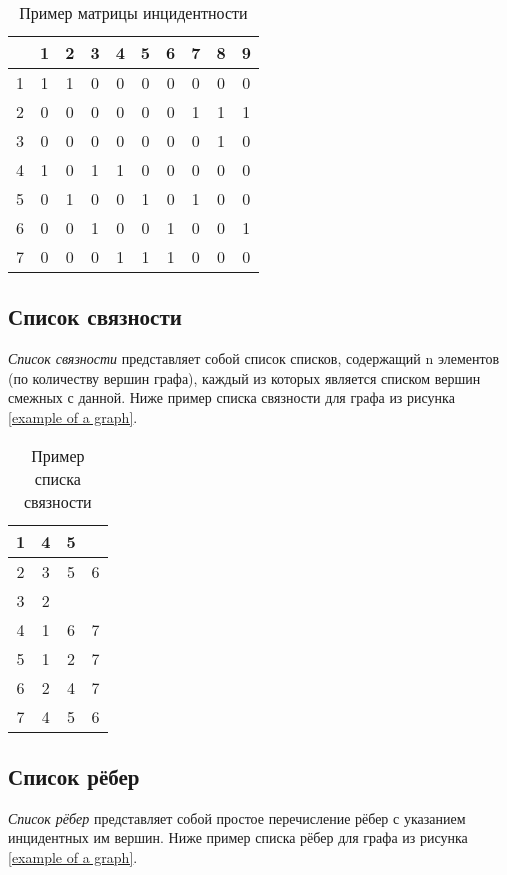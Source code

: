 \begin{table}[h]
	\center
	\begin{tabular}{|c|c|c|c|c|c|c|c|c|c|}
		\hline
		\space & 1 & 2 & 3 & 4 & 5 & 6 & 7 & 8 & 9\\
		\hline
		1 & 1 & 1 & 0 & 0 & 0 & 0 & 0 & 0 & 0\\
		2 & 0 & 0 & 0 & 0 & 0 & 0 & 1 & 1 & 1\\
		3 & 0 & 0 & 0 & 0 & 0 & 0 & 0 & 1 & 0\\
		4 & 1 & 0 & 1 & 1 & 0 & 0 & 0 & 0 & 0\\
		5 & 0 & 1 & 0 & 0 & 1 & 0 & 1 & 0 & 0\\
		6 & 0 & 0 & 1 & 0 & 0 & 1 & 0 & 0 & 1\\
		7 & 0 & 0 & 0 & 1 & 1 & 1 & 0 & 0 & 0\\
		\hline
	\end{tabular}
	\caption{Пример матрицы инцидентности}
\end{table}

\subsection{Список связности}

\emph{Список связности} представляет собой список списков, содержащий n 
элементов (по количеству вершин графа), каждый из которых является списком 
вершин смежных с данной. Ниже пример списка связности для графа из рисунка 
\ref{example of a graph}.

\begin{table}[h]
	\center
	\begin{tabular}{|c|ccc|}
		\hline
		1 & 4 & 5 &\\
		\hline
		2 & 3 & 5 & 6\\
		\hline
		3 & 2 & &\\
		\hline
		4 & 1 & 6 & 7\\
		\hline
		5 & 1 & 2 & 7\\
		\hline
		6 & 2 & 4 & 7\\
		\hline
		7 & 4 & 5 & 6\\
		\hline
	\end{tabular}
	\caption{Пример списка связности}
\end{table}

\subsection{Список рёбер}

\emph{Список рёбер} представляет собой простое перечисление рёбер с указанием 
инцидентных им вершин. Ниже пример списка рёбер для графа из рисунка \ref{example of a graph}.

